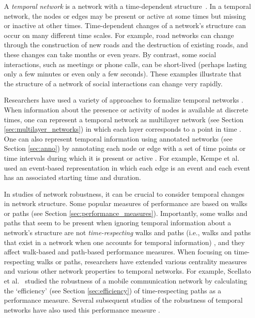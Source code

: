 \documentclass{comnet-mod}
\begin{document}
A \emph{temporal network} is a network with a time-dependent structure~\cite{Holme2012, holme2015, Lambiotte2016, Holme2019}. In a temporal network, the nodes or edges may be present or active at some times but missing or inactive at other times. Time-dependent changes of a network's structure can occur on many different time scales. For example, road networks can change through the construction of new roads and the destruction of existing roads, and these changes can take months or even years. By contrast, some social interactions, such as meetings or phone calls, can be short-lived (perhaps lasting only a few minutes or even only a few seconds). These examples illustrate that the structure of a network of social interactions can change very rapidly. 

Researchers have used a variety of approaches to formalize temporal networks \cite{Holme2012, holme2015, Lambiotte2016, Holme2019, Porter2020}. When information about the presence or activity of nodes is available at discrete times, one can represent a temporal network as multilayer network (see Section \ref{sec:multilayer_networks}) in which each layer corresponds to a point in time \cite{Porter2020}. One can also represent temporal information using annotated networks (see Section \ref{sec:anno}) by annotating each node or edge with a set of time points or time intervals during which it is present or active \cite{Holme2012}. For example, Kempe et al.~\cite{Kempe2002} used an {event-based representation} in which each edge is an event and each event has an associated starting time and duration.

In studies of network robustness, it can be crucial to consider temporal changes in network structure. Some popular measures of performance are based on walks or paths (see Section \ref{sec:performance_measures}). Importantly, some walks and paths that seem to be present when ignoring temporal information about a network's structure are not \textit{time-respecting} walks and paths (i.e., walks and paths that exist in a network when one accounts for temporal information) \cite{Konschake2013, Holme2019}, and they affect walk-based and path-based performance measures. When focusing on time-respecting walks or paths, researchers have extended various centrality measures \cite{Pan2011, Estrada2013, Rocha2014, Praprotnik2015, Lambiotte2016, Takaguchi2016, Taylor2017, Holme2019, Lv2019} and various other network properties \cite{Nicosia2013, Lambiotte2016, Holme2019} to temporal networks. For example, Scellato et al.~\cite{Scellato2011} studied the robustness of a mobile communication network by calculating the `efficiency' (see Section \ref{sec:efficiency}) of time-respecting paths as a performance measure. Several subsequent studies of the robustness of temporal networks have also used this performance measure \cite{Trajanovski2012, Sur2015, Feng2016, Sur2016, Feng2019}.
\end{document}
